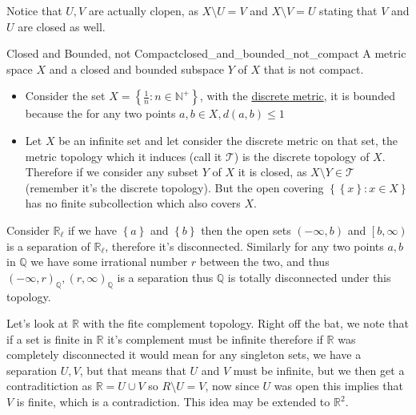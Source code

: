 

Notice that $ U, V $ are actually clopen, as $ X \setminus  U =  V $ and $ X \setminus  V = U $ stating that $ V $ and $ U $ are closed as well.

\begin{example}{Closed and Bounded, not Compact}{closed_and_bounded_not_compact}
A metric space $X$  and a closed and bounded subspace $Y$ of  $X$  that is not compact.
\end{example}


\begin{itemize}
    \item Consider the set $ X =  \left\{ \frac{1}{n}: n \in  \mathbb{N} ^{ +  }  \right\}  $, with the \hyperref[example:discrete_metric]{discrete metric}, it is bounded because the for any two points $ a, b \in X, d\left( a, b \right)  \le 1 $  %
    \item Let $ X $ be an infinite set and let consider the discrete metric on that set,  the metric topology which it induces (call it $ \mathcal{ T }  $)  is the discrete topology of $ X $. Therefore if we consider any subset $ Y $ of $ X $ it is closed, as $ X \setminus Y \in  \mathcal{ T }  $ (remember it's the discrete topology). But the open covering $ \left\{ \left\{ x \right\} : x \in  X \right\}  $ has no finite subcollection which also covers $ X $.
\end{itemize}







Consider $ \mathbb{R} _{ \ell } $ if we have $ \left\{ a \right\}  $ and $ \left\{ b \right\}  $ then the open sets $ \left( - \infty , b \right) $ and $ \left[ b, \infty  \right) $ is a separation of $ \mathbb{R} _{ \ell }  $, therefore it's disconnected. Similarly for any two points $ a, b $  in $ \mathbb{Q}  $ we have some irrational number $ r $ between the two, and thus $ \left( - \infty , r \right) _{ \mathbb{Q}  } , \left( r, \infty  \right) _{ \mathbb{Q}  }  $ is a separation thus $ \mathbb{Q}  $ is totally disconnected under this topology. 

Let's look at $ \mathbb{R}  $ with the fite complement topology. Right off the bat, we note that if a set is finite in $ \mathbb{R}  $ it's complement must be infinite therefore if $ \mathbb{R}  $ was completely disconnected it would mean for any singleton sets, we have a separation $ U, V $, but that means that $ U $ and $ V $ must be infinite, but we then get a contraditiction as $ \mathbb{R} =  U \cup V $ so $ R \setminus U = V $, now since $ U $ was open this implies that $ V $ is finite, which is a contradiction. This idea may be extended to $ \mathbb{R} ^{ 2 }  $.


